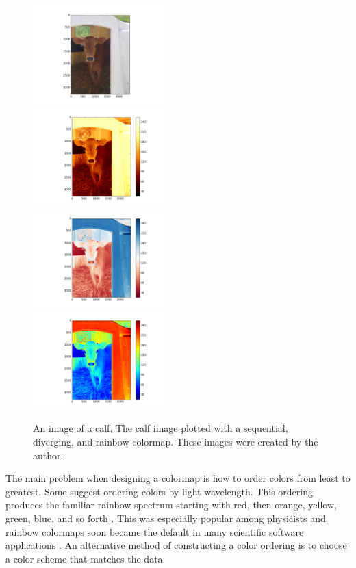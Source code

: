 \documentclass[journal,12pt]{IEEEtran}
\begin{document}
\begin{figure}
\centering
\includegraphics[width=2in]{calf_original} \\
\includegraphics[width=2in]{calf_sequential} \\
\includegraphics[width=2in]{calf_diverging} \\
\includegraphics[width=2in]{calf_rainbow} \\
\caption{An image of a calf. The calf image plotted with a
sequential, diverging, and rainbow colormap. These images were created by the author.}
\end{figure}

The main problem
when designing a colormap is how to order colors
from least to greatest. Some suggest
ordering colors by light wavelength. 
This ordering produces the familiar rainbow spectrum
starting with red, then orange,
yellow, green, blue, and so forth \cite{colormapping}.
This was especially popular among physicists and rainbow colormaps soon became the default
in many scientific software applications \cite{rainbowstill,matlab}.
An alternative method of constructing a color ordering is to choose a color scheme that matches the data.
\end{document}
